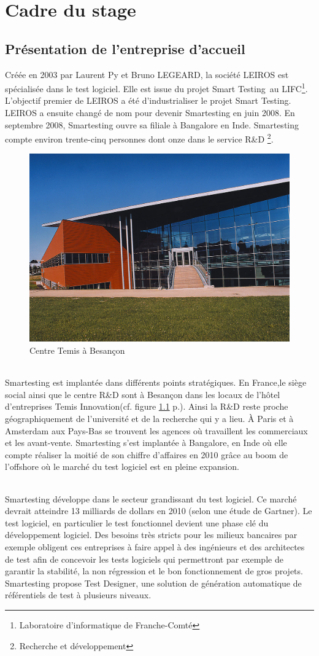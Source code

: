 \chapter{Cadre du stage}

\section{Présentation de l'entreprise d'accueil}
Créée en 2003 par Laurent Py et Bruno LEGEARD, la société LEIROS est spécialisée dans le test logiciel. Elle est issue du projet Smart Testing\texttrademark ~au LIFC\footnote{Laboratoire d'informatique de Franche-Comté}. L'objectif premier de LEIROS a été d'industrialiser le projet Smart Testing\texttrademark.  LEIROS a ensuite changé de nom pour devenir Smartesting en juin 2008. En septembre 2008, Smartesting ouvre sa filiale à Bangalore en Inde. Smartesting compte environ trente-cinq personnes dont onze dans le service R\&D \footnote{Recherche et développement}.

\begin{figure}[!ht]
\centering
\includegraphics[width=.55\textwidth]{Illustrations/temis.jpg}
\caption{Centre Temis à Besançon}
\label{figure:temis}
\end{figure}

\subparagraph*{}
Smartesting est implantée dans différents points stratégiques. En France,le siège social ainsi que le centre R\&D sont à Besançon dans les locaux de l'hôtel d'entreprises Temis Innovation(cf. figure \ref{figure:temis} p.\pageref{figure:temis}). Ainsi la R\&D reste proche géographiquement de l'université et de la recherche qui y a lieu. À Paris et à Amsterdam aux Pays-Bas se trouvent les agences où travaillent les commerciaux et les avant-vente. Smartesting s'est implantée à Bangalore, en Inde où elle compte réaliser la moitié de son chiffre d'affaires en 2010 grâce au boom de l'offshore où le marché du test logiciel est en pleine expansion.

\subparagraph*{}
Smartesting développe dans le secteur grandissant du test logiciel. Ce marché devrait atteindre 13 milliards de dollars en 2010 (selon une étude de Gartner). Le test logiciel, en particulier le test fonctionnel devient une phase clé du développement logiciel. Des besoins très stricts pour les milieux bancaires par exemple obligent ces entreprises à faire appel à des ingénieurs et des architectes de test afin de concevoir les tests logiciels qui permettront par exemple de garantir la stabilité, la non régression et le bon fonctionnement de gros projets. Smartesting propose Test Designer, une solution de génération automatique de référentiels de test à plusieurs niveaux.


